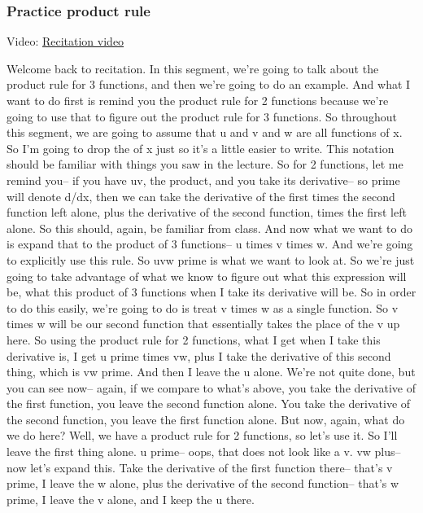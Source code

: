 \documentclass[pdftex, brazil, 12pt, twoside]{article}
\begin{document}
\subsubsection{Practice product rule}
\label{u2-product-rule-practice}

Video: \href{https://www.youtube.com/watch?v=\_R5fOYaSk0s}{Recitation video}

Welcome back to recitation.
In this segment, we're going to talk about the product
rule for 3 functions, and then we're going to do an example.
And what I want to do first is remind
you the product rule for 2 functions
because we're going to use that to figure out the product
rule for 3 functions.
So throughout this segment, we are
going to assume that u and v and w are all functions of x.
So I'm going to drop the of x just so it's
a little easier to write.
This notation should be familiar with things
you saw in the lecture.
So for 2 functions, let me remind you--
if you have uv, the product, and you
take its derivative-- so prime will denote d/dx,
then we can take the derivative of the first times
the second function left alone, plus the derivative
of the second function, times the first left alone.
So this should, again, be familiar from class.
And now what we want to do is expand that to the product of 3
functions-- u times v times w.
And we're going to explicitly use this rule.
So uvw prime is what we want to look at.
So we're just going to take advantage
of what we know to figure out what this expression will be,
what this product of 3 functions when I take its derivative
will be.
So in order to do this easily, we're
going to do is treat v times w as a single function.
So v times w will be our second function that essentially takes
the place of the v up here.
So using the product rule for 2 functions, what
I get when I take this derivative is,
I get u prime times vw, plus I take the derivative
of this second thing, which is vw prime.
And then I leave the u alone.
We're not quite done, but you can see now--
again, if we compare to what's above,
you take the derivative of the first function,
you leave the second function alone.
You take the derivative of the second function,
you leave the first function alone.
But now, again, what do we do here?
Well, we have a product rule for 2 functions, so let's use it.
So I'll leave the first thing alone. u prime--
oops, that does not look like a v. vw plus-- now let's
expand this.
Take the derivative of the first function there--
that's v prime, I leave the w alone,
plus the derivative of the second function-- that's
w prime, I leave the v alone, and I keep the u there.
\end{document}
